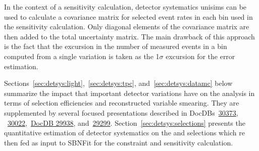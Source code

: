 \par In the context of a sensitivity calculation, detector systematics unisims can be used to calculate a covariance matrix for selected event rates in each bin used in the sensitivity calculation. Only diagonal elements of the covariance matrix are then added to the total uncertainty matrix. 
The main drawback of this approach is the fact that the excursion in the number of measured events in a bin computed from a single variation is taken as the 1$\sigma$ excursion for the error estimation.
\par Sections~\ref{sec:detsys:light},~\ref{sec:detsys:tpc}, and~\ref{sec:detsys:datamc} below summarize the impact that important detector variations have on the analysis in terms of selection efficiencies and reconstructed variable smearing. They are supplemented by several focused presentations described in DocDBs~\href{https://microboone-docdb.fnal.gov/cgi-bin/private/ShowDocument?docid=30373}{30373}, ~\href{https://microboone-docdb.fnal.gov/cgi-bin/private/ShowDocument?docid=30022}{30022},~\href{https://microboone-docdb.fnal.gov/cgi-bin/private/ShowDocument?docid=29938}{DocDB 29938}, and~\href{https://microboone-docdb.fnal.gov/cgi-bin/private/ShowDocument?docid=29299}{29299}. Section~\ref{sec:detsys:selections} presents the quantitative estimation of detector systematics on the \nue and \numu selections which re then fed as input to SBNFit for the constraint and sensitivity calculation.

